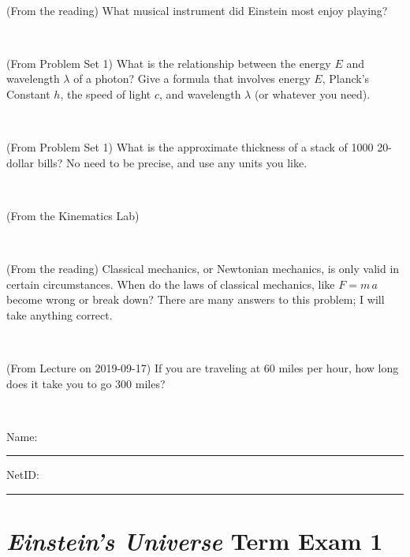 \documentclass[12pt, letterpaper]{article}
\begin{document}
\vfill ~

\begin{problem} (From the reading)
What musical instrument did Einstein most enjoy playing?
\end{problem}


\vfill ~

\begin{problem} (From Problem Set 1)
What is the relationship between the energy $E$ and wavelength
$\lambda$ of a photon? Give a formula that involves energy $E$,
Planck's Constant $h$, the speed of light $c$, and wavelength
$\lambda$ (or whatever you need).
\end{problem}

\vfill ~


\clearpage


\begin{problem} (From Problem Set 1)
What is the approximate thickness of a stack of 1000 20-dollar bills?
No need to be precise, and use any units you like.
\end{problem}


\vfill ~

\begin{problem} (From the Kinematics Lab)

\end{problem}


\vfill ~

\begin{problem} (From the reading)
Classical mechanics, or Newtonian mechanics, is only valid in certain
circumstances. When do the laws of classical mechanics, like $F =
m\,a$ become wrong or break down? There are many answers to this
problem; I will take anything correct.
\end{problem}


\vfill ~

\begin{problem} (From Lecture on 2019-09-17)
If you are traveling at 60 miles per hour, how long does
it take you to go 300 miles?
\end{problem}


\vfill ~


\cleardoublepage



\noindent
Name: \rule[-1ex]{0.60\textwidth}{0.1pt}
NetID: \rule[-1ex]{0.20\textwidth}{0.1pt}

\section*{\textsl{Einstein's Universe} Term Exam 1}
\setcounter{problem}{1}
\end{document}

